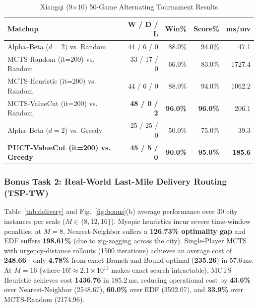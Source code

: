 \documentclass[conference]{IEEEtran}
\begin{document}
\begin{table}[t]
\centering
\caption{Xiangqi (9$\times$10) 50-Game Alternating Tournament Results}
\label{tab:xiangqi}
\begin{tabular}{@{}lrrrr@{}}
\toprule
\textbf{Matchup} & \textbf{W / D / L} & \textbf{Win\%} & \textbf{Score\%} & \textbf{ms/mv} \\
\midrule
Alpha--Beta ($d=2$) vs. Random & 44 / 6 / 0 & 88.0\% & 94.0\% & 47.1 \\
MCTS-Random (it=200) vs. Random & 33 / 17 / 0 & 66.0\% & 83.0\% & 1727.4 \\
MCTS-Heuristic (it=200) vs. Random & 44 / 6 / 0 & 88.0\% & 94.0\% & 1062.2 \\
MCTS-ValueCut (it=200) vs. Random & \textbf{48 / 0 / 2} & \textbf{96.0\%} & \textbf{96.0\%} & 206.1 \\
\midrule
Alpha--Beta ($d=2$) vs. Greedy & 25 / 25 / 0 & 50.0\% & 75.0\% & 39.3 \\
\textbf{PUCT-ValueCut (it=200) vs. Greedy} & \textbf{45 / 5 / 0} & \textbf{90.0\%} & \textbf{95.0\%} & \textbf{185.6} \\
\bottomrule
\end{tabular}
\end{table}

\subsubsection{Bonus Task 2: Real-World Last-Mile Delivery Routing (TSP-TW)}
Table~\ref{tab:delivery} and Fig.~\ref{fig:bonus}(b) average performance over 30 city instances per scale ($M \in \{8, 12, 16\}$). Myopic heuristics incur severe time-window penalties: at $M=8$, Nearest-Neighbor suffers a \textbf{126.73\% optimality gap} and EDF suffers \textbf{198.61\%} (due to zig-zagging across the city). Single-Player MCTS with urgency-distance rollouts (1500 iterations) achieves an average cost of \textbf{248.66}---only \textbf{4.78\%} from exact Branch-and-Bound optimal (\textbf{235.26}) in 57.6\,ms. At $M=16$ (where $16! \approx 2.1 \times 10^{13}$ makes exact search intractable), MCTS-Heuristic achieves cost \textbf{1436.76} in 185.2\,ms, reducing operational cost by \textbf{43.6\%} over Nearest-Neighbor (2548.67), \textbf{60.0\%} over EDF (3592.07), and \textbf{33.9\%} over MCTS-Random (2174.96).
\end{document}

